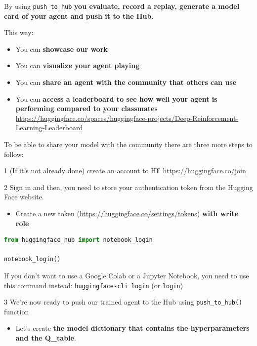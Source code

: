 \documentclass[11pt,a4paper]{article}
\begin{document}
By using \passthrough{\lstinline!push_to_hub!} \textbf{you evaluate, record a replay, generate a model card of your agent and push it to the Hub}.

This way:

\begin{itemize}
\tightlist
\item
  You can \textbf{showcase our work}
\item
  You can \textbf{visualize your agent playing}
\item
  You can \textbf{share an agent with the community that others can use}
\item
  You can \textbf{access a leaderboard to see how well your agent is performing compared to your classmates} \url{https://huggingface.co/spaces/huggingface-projects/Deep-Reinforcement-Learning-Leaderboard}
\end{itemize}

To be able to share your model with the community there are three more steps to follow:

1 (If it's not already done) create an account to HF \url{https://huggingface.co/join}

2 Sign in and then, you need to store your authentication token from the Hugging Face website.

\begin{itemize}
\tightlist
\item
  Create a new token (\url{https://huggingface.co/settings/tokens}) \textbf{with write role}
\end{itemize}


\begin{lstlisting}[language=Python]
from huggingface_hub import notebook_login

notebook_login()
\end{lstlisting}

If you don't want to use a Google Colab or a Jupyter Notebook, you need to use this command instead: \passthrough{\lstinline!huggingface-cli login!} (or \passthrough{\lstinline!login!})

3 We're now ready to push our trained agent to the Hub using \passthrough{\lstinline!push_to_hub()!} function

\begin{itemize}
\tightlist
\item
  Let's create \textbf{the model dictionary that contains the hyperparameters and the Q\_table}.
\end{itemize}
\end{document}

